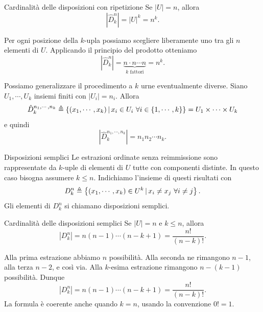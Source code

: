 \documentclass[a4paper]{article}
\begin{document}
\begin{snippetproposition}{Cardinalità delle disposizioni con ripetizione}
    Se \(|U|=n\), allora
    \[
        |\hat D_k^n|=|U|^k=n^k.
    \]
\end{snippetproposition}

\begin{snippetproof}{}
    Per ogni posizione della \(k\)-upla possiamo scegliere liberamente uno tra gli \(n\) elementi di \(U\).
    Applicando il principio del prodotto otteniamo
    \[
        |\hat D_k^n|
        =
        \underbrace{n\cdot n\cdots n}_{k\text{ fattori}}
        =
        n^k.
    \]
\end{snippetproof}

Possiamo generalizzare il procedimento a \(k\) urne eventualmente diverse.
Siano \(U_1,\cdots,U_k\) insiemi finiti con \(|U_i|=n_i\).
Allora
\[
    \hat D_k^{n_1,\cdots,n_k}
    \triangleq
    \left\{
        (x_1,\cdots,x_k) \,|\, x_i\in U_i\ \forall i\in\{1,\cdots,k\}
    \right\}
    =
    U_1\times \cdots \times U_k
\]
e quindi
\[
    \left|\hat D_k^{n_1,\cdots,n_k}\right|
    =
    n_1n_2\cdots n_k.
\]

\begin{snippetdefinition}{Disposizioni semplici}
    Le estrazioni ordinate senza reimmissione sono rappresentate da \(k\)-uple di elementi di \(U\) tutte con componenti distinte.
    In questo caso bisogna assumere \(k\leq n\).
    Indichiamo l'insieme di questi risultati con
    \[
        D_k^n
        \triangleq
        \left\{
            (x_1,\cdots,x_k)\in U^k \,|\, x_i\neq x_j\ \forall i\neq j
        \right\}.
    \]
    Gli elementi di \(D_k^n\) si chiamano disposizioni semplici.
\end{snippetdefinition}

\begin{snippetproposition}{Cardinalità delle disposizioni semplici}
    Se \(|U|=n\) e \(k\leq n\), allora
    \[
        |D_k^n|
        =
        n(n-1)\cdots(n-k+1)
        =
        \frac{n!}{(n-k)!}.
    \]
\end{snippetproposition}

\begin{snippetproof}{}
    Alla prima estrazione abbiamo \(n\) possibilità.
    Alla seconda ne rimangono \(n-1\), alla terza \(n-2\), e così via.
    Alla \(k\)-esima estrazione rimangono \(n-(k-1)\) possibilità.
    Dunque
    \[
        |D_k^n|
        =
        n(n-1)\cdots(n-k+1)
        =
        \frac{n!}{(n-k)!}.
    \]
    La formula è coerente anche quando \(k=n\), usando la convenzione \(0!=1\).
\end{snippetproof}
\end{document}
